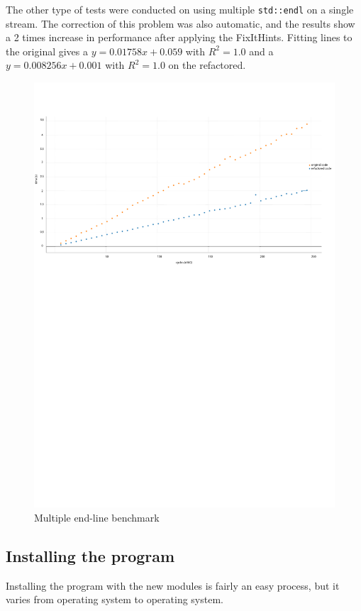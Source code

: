 \par The other type of tests were conducted on using multiple \verb|std::endl| on a single stream. The correction of this problem was also automatic, and the results show a 2 times increase in performance after applying the FixItHints. Fitting lines to the original gives a $y=0.01758x+0.059$ with $R^2=1.0$ and a $y=0.008256x+0.001$ with $R^2=1.0$ on the refactored. 
\begin{figure}[H]
	\caption{Multiple end-line benchmark}
	\includegraphics[scale=0.7]{images/stream_endline_performance.pdf}
\end{figure}
\subsection{Installing the program}
Installing the program with the new modules is fairly an easy process, but it varies from operating system to operating system.
